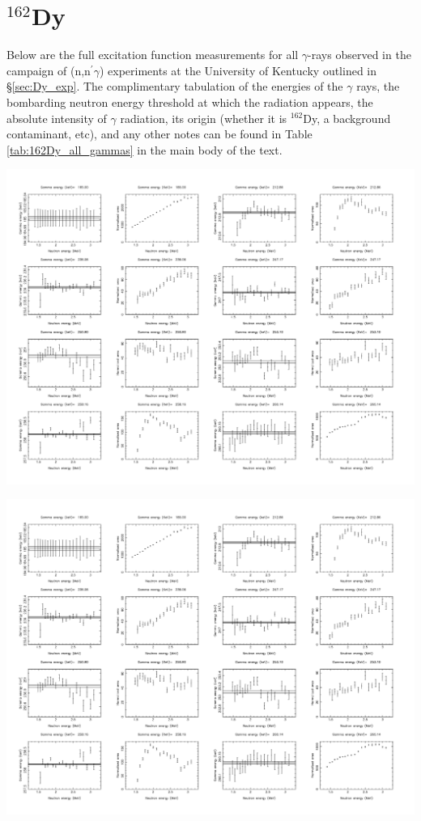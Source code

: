 \section{$^{162}$Dy}\label{app:EXF_Dy}
Below are the full excitation function measurements for all $\gamma$-rays observed in the campaign of (n,n$^\prime\gamma$) experiments at the University of Kentucky outlined in \S \ref{sec:Dy_exp}. The complimentary tabulation of the energies of the $\gamma$ rays, the bombarding neutron energy threshold at which the radiation appears, the absolute intensity of $\gamma$ radiation, its origin (whether it is $^{162}$Dy, a background contaminant, etc), and any other notes can be found in Table \ref{tab:162Dy_all_gammas} in the main body of the text.
\begin{center}
\includegraphics[page=1,angle=90,height=0.95\textheight]{162Dy_stitched.pdf}
\end{center}
\begin{center}
\includegraphics[page=2,angle=90,height=0.95\textheight]{162Dy_stitched.pdf}
\end{center}

